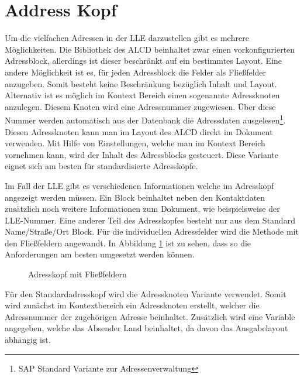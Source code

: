 \FloatBarrier
\section{Address Kopf}

Um die vielfachen Adressen in der \ac{LLE} darzustellen gibt es mehrere Möglichkeiten. Die Bibliothek des \ac{ALCD} beinhaltet zwar einen vorkonfigurierten Adressblock, allerdings ist dieser beschränkt auf ein bestimmtes Layout.  Eine andere Möglichkeit ist es, für jeden Adressblock die Felder als Fließfelder anzugeben. Somit besteht keine Beschränkung bezüglich Inhalt und Layout. Alternativ ist es möglich im Kontext Bereich einen sogenannte Adressknoten anzulegen. Diesem Knoten wird eine Adressnummer zugewiesen. Über diese Nummer werden automatisch aus der Datenbank die Adressdaten ausgelesen\footnote{SAP Standard Variante zur Adressenverwaltung}. Diesen Adressknoten kann man im Layout des \ac{ALCD} direkt im Dokument verwenden. Mit Hilfe von Einstellungen, welche man im Kontext Bereich vornehmen kann, wird der Inhalt des Adressblocks gesteuert. Diese Variante eignet sich am besten für standardisierte Adressköpfe.

Im Fall der \ac{LLE} gibt es verschiedenen Informationen welche im Adresskopf angezeigt werden müssen. Ein Block beinhaltet neben den Kontaktdaten zusätzlich noch weitere Informationen zum Dokument, wie beispielsweise der \ac{LLE}-Nummer. Eine anderer Teil des Adresskopfes besteht nur aus dem Standard Name/Straße/Ort Block.
Für die individuellen Adressfelder wird die Methode mit den Fließfeldern angewandt. In Abbildung \ref{figAdr}
ist zu sehen, dass so die Anforderungen am besten umgesetzt werden können.

\begin{figure}[ht]
	\centering
	\caption{Adresskopf mit Fließfeldern}
	\label{figAdr}
	
\end{figure}

Für den Standardadresskopf wird die Adressknoten Variante verwendet. Somit wird zunächst im Kontextbereich ein Adressknoten erstellt, welcher die Adressnummer der zugehörigen Adresse beinhaltet. Zusätzlich wird eine Variable angegeben, welche das Absender Land beinhaltet, da davon das Ausgabelayout abhängig ist.

